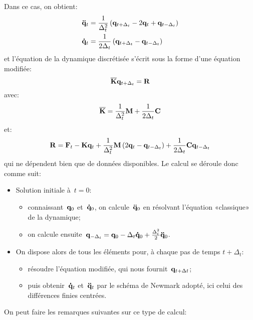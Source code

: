 Dans ce cas, on obtient:
\begin{equation}
\begin{aligned}
&\VV{\ddot q}_t = \frac1{\Delta_t^2} \left( \VV{q}_{t+\Delta_t} - 2\VV{q}_t + \VV{q}_{t-\Delta_t}\right)\\
&\VV{\dot q}_t = \frac1{2\Delta_t}\left( \VV{q}_{t+\Delta_t} - \VV{q}_{t-\Delta_t}\right)
\end{aligned}
\end{equation}
et l'équation de la dynamique discrétisée s'écrit sous la forme d'une équation modifiée:
\begin{equation}
\MM{\overline{K}} \VV{q}_{t+\Delta_t} = \VV{R}
\end{equation}
avec:
\begin{equation}
\MM{\overline{K}} = \frac1{\Delta_t^2}\MM{M}+\frac1{2\Delta_t}\MM{C}
\end{equation}
et:
\begin{equation}
\VV{R} = \VV{F}_t -\MM{K}\VV{q}_t + \frac1{\Delta_t^2}\MM{M}\left( 2\VV{q}_t -\VV{q}_{t-\Delta_t}\right)
+\frac1{2\Delta_t}\MM{C}\VV{q}_{t-\Delta_t}
\end{equation}
qui ne dépendent bien que de données disponibles.
\medskipvm
Le calcul se déroule donc comme suit:
\begin{itemize}
  \item Solution initiale à~$t=0$:
	\begin{itemize}
	\item connaissant~$\VV{q}_0$ et~$\VV{\dot q}_0$, on calcule~$\VV{\ddot q}_0$ en résolvant
	l'équation «classique» de la dynamique;
	\item on calcule ensuite~$\VV{q}_{-\Delta_t} = \VV{q}_0 -\Delta_t \VV{\dot q}_0 + \frac{\Delta_t^2}2
	\VV{\ddot q}_0$.
	\end{itemize}
  \item On dispose alors de tous les éléments pour, à chaque pas de temps
	$t+\Delta_t$:
	\begin{itemize}
	\item résoudre l'équation modifiée, qui nous fournit~$\VV{q}_{t+\Delta t}$;
	\item puis obtenir~$\VV{\dot q}_t$ et~$\VV{\ddot q}_t$ par le schéma de Newmark adopté,
	ici celui des différences finies centrées.
	\end{itemize}
\end{itemize}
\bigskip
On peut faire les remarques suivantes sur ce type de calcul:
